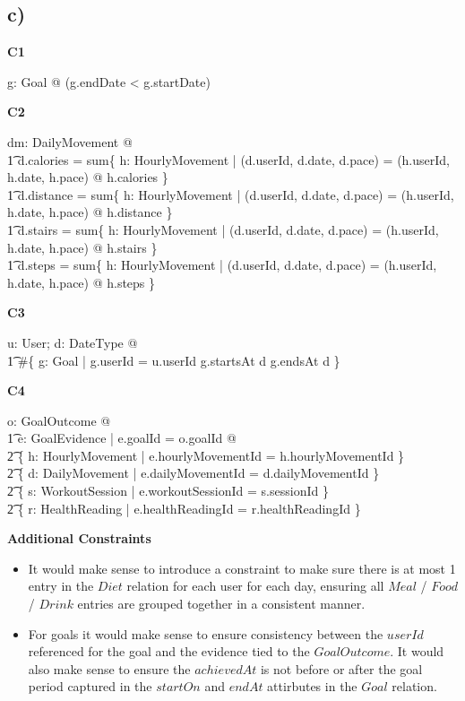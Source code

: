 \documentclass{article}
\begin{document}
\pagebreak

\subsection*{\small c)}

\textbf{\small{C1}}
\begin{zed}
\forall g: Goal @ \lnot (g.endDate < g.startDate) \\
\end{zed}
\textbf{\small{C2}}
\begin{zed}
\forall dm: DailyMovement @ \\
    \t1 d.calories = sum\{ h: HourlyMovement | (d.userId, d.date, d.pace) = (h.userId, h.date, h.pace) @ h.calories \} \\
    \t1 d.distance = sum\{ h: HourlyMovement | (d.userId, d.date, d.pace) = (h.userId, h.date, h.pace) @ h.distance \} \\
    \t1 d.stairs = sum\{ h: HourlyMovement | (d.userId, d.date, d.pace) = (h.userId, h.date, h.pace) @ h.stairs \} \\
    \t1 d.steps = sum\{ h: HourlyMovement | (d.userId, d.date, d.pace) = (h.userId, h.date, h.pace) @ h.steps \} \\
\end{zed}
\textbf{\small{C3}}
\begin{zed}
\forall u: User; d: DateType @ \\
\t1 \#\{ g: Goal | g.userId = u.userId \land g.startsAt \leq d \land g.endsAt \geq d \} 
\end{zed}
\textbf{\small{C4}}
\begin{zed}
\forall o: GoalOutcome @ \\
\t1 \exists e: GoalEvidence | e.goalId = o.goalId @ \\
\t2 \{ h: HourlyMovement | e.hourlyMovementId = h.hourlyMovementId \} \neq \emptyset \lor \\
\t2 \{ d: DailyMovement | e.dailyMovementId = d.dailyMovementId \} \neq \emptyset \lor \\
\t2 \{ s: WorkoutSession | e.workoutSessionId = s.sessionId \} \neq \emptyset \\
\t2 \{ r: HealthReading | e.healthReadingId = r.healthReadingId \} \neq \emptyset \lor \\
\end{zed}
\textbf{\small{Additional Constraints}}

\begin{itemize}
  \item It would make sense to introduce a constraint to make sure there is at most 1 entry in the $Diet$ relation for each user for each day, ensuring all $Meal$ / $Food$ / $Drink$ entries are grouped together in a consistent manner.
  \item For goals it would make sense to ensure consistency between the $userId$ referenced for the goal and the evidence tied to the $GoalOutcome$. It would also make sense to ensure the $achievedAt$ is not before or after the goal period captured in the $startOn$ and $endAt$ attirbutes in the $Goal$ relation.
\end{itemize}
\end{document}
